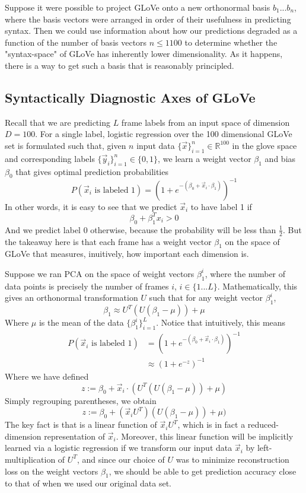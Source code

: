 \documentclass[a4paper]{article}
\begin{document}
Suppose it were possible to project GLoVe onto a new orthonormal basis $b_1 ... b_{n}$, where the basis vectors were arranged in order of their usefulness in predicting syntax. Then we could use information about how our predictions degraded as a function of the number of basis vectors $n \le1  100$ to determine whether the "syntax-space" of GLoVe has inherently lower dimensionality. As it happens, there is a way to get such a basis that is reasonably principled.

\subsection{Syntactically Diagnostic Axes of GLoVe}

Recall that we are predicting $L$ frame labels from an input space of dimension $D=100$. For a single label, logistic regression over the 100 dimensional GLoVe set is formulated such that, given $n$ input data $\{\vec x\}_{i=1}^n \in \mathbb{R}^{100}$ in the glove space and corresponding labels $\{\vec y_i\}_{i=1}^n \in \{0,1\}$, we learn a weight vector $\beta_1$ and bias $\beta_0$ that gives optimal prediction probabilities
\[ P(\vec x_i \text{ is labeled } 1) = (1 + e^{-(\beta_0 + \vec x_i \cdot \beta_1)})^{-1} \]
In other words, it is easy to see that we predict $\vec x_i$ to have label 1 if 
\[  \beta_0 + \beta_1^T x_i > 0 \]
And we predict label 0 otherwise, because the probability will be less than $\frac{1}{2}$. But the takeaway here is that each frame has a weight vector $\beta_1$ on the space of GLoVe that measures, inuitively, how important each dimension is.  

Suppose we ran PCA on the space of weight vectors $\beta_1^i$, where the number of data points is precisely the number of frames $i$, $i \in \{1...L\}$. Mathematically, this gives an orthonormal transformation $U$ such that for any weight vector $\beta_1^i$, 
\[ \beta_1 \approx U^T(U(\beta_1 - \mu)) + \mu \] 
Where $\mu$ is the mean of the data $\{\beta_1^i\}_{i=1}^L$. Notice that intuitively, this means
\begin{align*} 
P(\vec x_i \text{ is labeled } 1) &= (1 + e^{-(\beta_0 + \vec x_i \cdot \beta_1)})^{-1}  \\
&\approx (1 + e^{-z})^{-1} 
\end{align*}
Where we have defined
\[ z := \beta_0 + \vec x_i \cdot (U^T(U(\beta_1 - \mu)) + \mu) \]
Simply regrouping parentheses, we obtain
\[ z := \beta_0 + (\vec x_i  U^T)(U(\beta_1 - \mu)) + \mu) \]
The key fact is that is a linear function of $\vec x_i U^T$, which is in fact a reduced-dimension representation of $\vec x_i$. Moreover, this linear function will be implicitly learned via a logistic regression if we transform our input data $\vec x_i$ by left-multiplication of $U^T$, and since our choice of $U$ was to minimize reconstruction loss on the weight vectors $\beta_1$, we should be able to get prediction accuracy close to that of when we used our original data set. 
\end{document}
